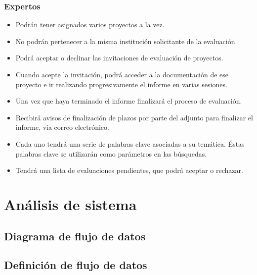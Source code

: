 \documentclass[12pt,a4paper,spanish,twoside]{article}
\begin{document}
\subsubsection{Expertos}
\begin{itemize}
\item Podrán tener asignados varios proyectos a la vez. 
\item No podrán pertenecer a la misma institución solicitante de la evaluación.
\item Podrá aceptar o declinar las invitaciones de evaluación de proyectos.
\item Cuando acepte la invitación, podrá acceder a la documentación de ese
  proyecto e ir realizando progresivamente el informe en varias sesiones. 
\item Una vez que haya terminado el informe finalizará el proceso de 
  evaluación.
\item Recibirá avisos de finalización de plazos por parte del adjunto para
  finalizar el informe, vía correo electrónico.
\item Cada uno tendrá una serie de palabras clave asociadas a su
  temática. Éstas palabras clave se utilizarán como parámetros en las
  búsquedas. 
\item Tendrá una lista de evaluaciones pendientes, que podrá aceptar o 
  rechazar.
\end{itemize}

\section{Análisis de sistema}
\subsection{Diagrama de flujo de datos}


\subsection{Definición de flujo de datos}
\end{document}
